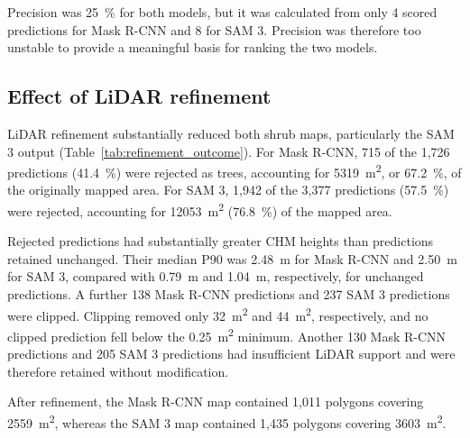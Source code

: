 \documentclass[12pt,a4paper]{article}
\begin{document}
Precision was \qty{25}{\percent} for both models, but it was calculated from only 4 scored predictions for Mask R-CNN and 8 for SAM 3. Precision was therefore too unstable to provide a meaningful basis for ranking the two models.

\subsection{Effect of LiDAR refinement}

LiDAR refinement substantially reduced both shrub maps, particularly the SAM 3 output (Table~\ref{tab:refinement_outcome}). For Mask R-CNN, 715 of the 1,726 predictions (\qty{41.4}{\percent}) were rejected as trees, accounting for \qty{5319}{\square\metre}, or \qty{67.2}{\percent}, of the originally mapped area. For SAM 3, 1,942 of the 3,377 predictions (\qty{57.5}{\percent}) were rejected, accounting for \qty{12053}{\square\metre} (\qty{76.8}{\percent}) of the mapped area.

Rejected predictions had substantially greater CHM heights than predictions retained unchanged. Their median P90 was \qty{2.48}{\metre} for Mask R-CNN and \qty{2.50}{\metre} for SAM 3, compared with \qty{0.79}{\metre} and \qty{1.04}{\metre}, respectively, for unchanged predictions. A further 138 Mask R-CNN predictions and 237 SAM 3 predictions were clipped. Clipping removed only \qty{32}{\square\metre} and \qty{44}{\square\metre}, respectively, and no clipped prediction fell below the \qty{0.25}{\square\metre} minimum. Another 130 Mask R-CNN predictions and 205 SAM 3 predictions had insufficient LiDAR support and were therefore retained without modification.

After refinement, the Mask R-CNN map contained 1,011 polygons covering \qty{2559}{\square\metre}, whereas the SAM 3 map contained 1,435 polygons covering \qty{3603}{\square\metre}.

\begin{table}[ht]
    \centering
    \caption{
        Outcome of the LiDAR refinement on the deployed shrub maps.
    }
    \label{tab:refinement_outcome}
\end{table}
\end{document}
